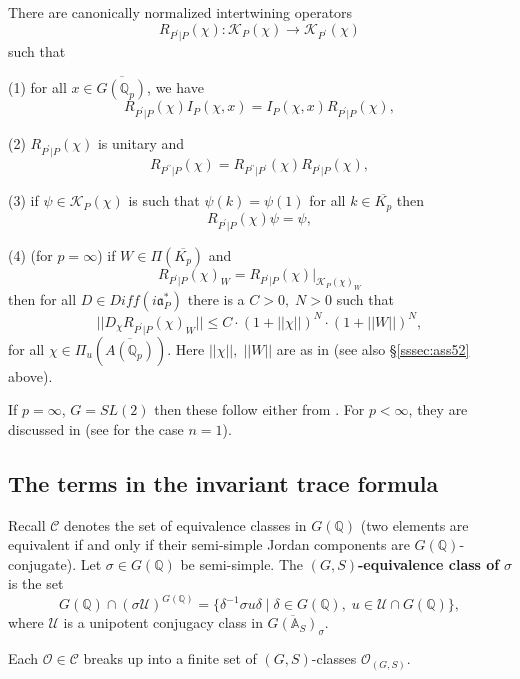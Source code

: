 \begin{conjecture}\label{conj:6.10}
There are canonically normalized intertwining operators 
\[
R_{P^{\prime }|P}(\chi ):{\mathcal{K}}_P(\chi )\rightarrow
{\mathcal{K}}_{P^{\prime}}(\chi ) 
\]
such that

(1) for all $x\in \overline{G({\mathbb{Q}}_p)}$, we have 
\[
R_{P^{\prime }|P}(\chi )I_P(\chi ,x)
=I_P(\chi ,x)R_{P^{\prime }|P}(\chi ), 
\]

(2) $R_{P^{\prime }|P}(\chi )$ is unitary and 
\[
R_{P^{\prime \prime }|P}(\chi )
=R_{P^{\prime \prime }|P^{\prime }}(\chi)R_{P^{\prime }|P}(\chi ), 
\]

(3) if $\psi \in {\mathcal K}_P(\chi )$ is such that
$\psi (k)=\psi (1)$
for all $k\in \overline{K_p}$ then 
\[
R_{P^{\prime }|P}(\chi )\psi =\psi , 
\]

(4) (for $p=\infty $) if $W\in \Pi (\overline{K_p})$ and 
\[
R_{P^{\prime }|P}(\chi )_W=R_{P^{\prime }|P}(\chi )|_{{\mathcal{K}}_P(\chi )_W}
\]
then for all $D\in Diff(i{\mathfrak {a}}_P^{*})$ there is a $C>0,\;N>0$ such
that 
\[
||D_\chi R_{P^{\prime }|P}(\chi )_W||\leq C\cdot (1+||\chi ||)^N\cdot
(1+||W||)^N,
\]
for all $\chi \in \Pi _u(\overline{A({\mathbb{Q}}_p)})$.
Here $||\chi||,\;||W||$ are as in \cite[section 5]{A6}
(see also \S\ref{sssec:ass52} above).
\end{conjecture}

If $p=\infty $, $G=SL(2)$ then these follow either from \cite{Sa}.
For $p<\infty$, they are discussed in \cite{J1} (see \cite[section 2]{A16}
for the case $n=1$).

\subsection{The terms in the invariant trace formula}

Recall ${\mathcal C}$ denotes the set of equivalence classes in $G({\mathbb {Q}})$
(two elements are equivalent if and only if their semi-simple
Jordan components are $G({\mathbb{Q}})$-conjugate). Let
$\sigma \in G({\mathbb{Q}})$ be semi-simple. The
$(G,S)${\bf -equivalence class of }$\sigma $ is
the set 
\[
G({\mathbb{Q}})\cap (\sigma {\mathcal{U}})^{G({\mathbb{Q}})}
=\{\delta ^{-1}\sigma u\delta
\;|\;\delta \in G({\mathbb{Q}}),\;u\in {\mathcal{U}}\cap G({\mathbb{Q}})\}, 
\]
where ${\mathcal{U}}$ is a unipotent conjugacy class in
$\overline{G({\mathbb {A}}_S)}_\sigma$.

\begin{lemma}\label{lem:6.11}
Each ${\mathcal{O}}\in {\mathcal{C}}$ breaks up into a finite set of
$(G,S)$-classes ${\mathcal{O}}_{(G,S)}$.
\end{lemma}

